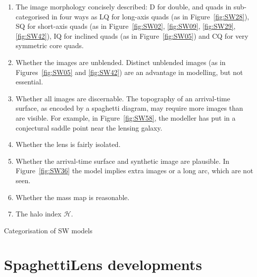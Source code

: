 \documentclass[fleqn,usenatbib]{mnras}
\newcommand{\figref}[1]{\ref{fig:#1}}
\newcommand{\haloindex}{\mathcal{H}}
\begin{document}
\begin{enumerate}
\item The image morphology concisely described: D for double, and
  quads in sub-categorised in four ways
  \citep[cf.][]{2003AJ....125.2769S} as LQ for long-axis quads (as in
  Figure~\figref{SW28}), SQ for short-axis quads (as in
  Figure~\figref{SW02}, \figref{SW09}, \figref{SW29}, \figref{SW42}),
  IQ for inclined quads (as in Figure~\figref{SW05}) and CQ for very
  symmetric core quads.
\item Whether the images are unblended.  Distinct unblended images (as
  in Figures~\figref{SW05} and \figref{SW42}) are an advantage in
  modelling, but not essential.
\item Whether all images are discernable.  The topography of an
  arrival-time surface, as encoded by a spaghetti diagram, may require
  more images than are visible.  For example, in Figure~\figref{SW58},
  the modeller has put in a conjectural saddle point near the lensing
  galaxy.
\item Whether the lens is fairly isolated.
\item Whether the arrival-time surface and synthetic image are
  plausible.  In Figure~\figref{SW36} the model implies extra images
  or a long arc, which are not seen.
\item Whether the mass map is reasonable.
\item The halo index $\haloindex$.
\end{enumerate}

\begin{table}
  \caption{Categorisation of SW models}
  \label{tab:models}
  
\end{table}







\clearpage

\section{SpaghettiLens developments}
\end{document}
